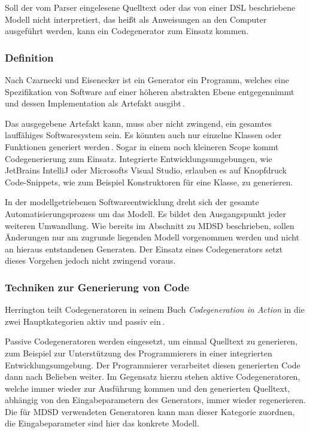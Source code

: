 \documentclass[12pt,oneside,a4paper,parskip]{scrbook}
\begin{document}
Soll der vom Parser eingelesene Quelltext oder das von einer DSL beschriebene Modell nicht interpretiert, das heißt als Anweisungen an den Computer ausgeführt werden, kann ein Codegenerator zum Einsatz kommen.

\subsubsection{Definition}

Nach Czarnecki und Eisenecker ist ein Generator ein Programm, welches eine Spezifikation von Software auf einer höheren abstrakten Ebene entgegennimmt und dessen Implementation als Artefakt ausgibt\,\cite[S. 333]{czaeis2000}.

Das ausgegebene Artefakt kann, muss aber nicht zwingend, ein gesamtes lauffähiges Softwaresystem sein. Es könnten auch nur einzelne Klassen oder Funktionen generiert werden\,\cite[S. 333]{czaeis2000}. Sogar in einem noch kleineren Scope kommt Codegenerierung zum Einsatz. Integrierte Entwicklungsumgebungen, wie JetBrains IntelliJ oder Microsofts Visual Studio, erlauben es auf Knopfdruck Code-Snippets, wie zum Beispiel Konstruktoren für eine Klasse, zu generieren.

In der modellgetriebenen Softwareentwicklung dreht sich der gesamte Automatisierungsprozess um das Modell. Es bildet den Ausgangspunkt jeder weiteren Umwandlung. Wie bereits im Abschnitt zu MDSD beschrieben, sollen Änderungen nur am zugrunde liegenden Modell vorgenommen werden und nicht an hieraus entstandenen Generaten. Der Einsatz eines Codegenerators setzt dieses Vorgehen jedoch nicht zwingend voraus.

\subsubsection{Techniken zur Generierung von Code}

Herrington teilt Codegeneratoren in seinem Buch \textit{Codegeneration in Action} in die zwei Hauptkategorien aktiv und passiv ein\,\cite[S. 28]{herrington2003}.

Passive Codegeneratoren werden eingesetzt, um einmal Quelltext zu generieren, zum Beispiel zur Unterstützung des Programmierers in einer integrierten Entwicklungsumgebung. Der Programmierer verarbeitet diesen generierten Code dann nach Belieben weiter. Im Gegensatz hierzu stehen aktive Codegeneratoren, welche immer wieder zur Ausführung kommen und den generierten Quelltext, abhängig von den Eingabeparametern des Generators, immer wieder regenerieren. Die für MDSD verwendeten Generatoren kann man dieser Kategorie zuordnen, die Eingabeparameter sind hier das konkrete Modell.
\end{document}
